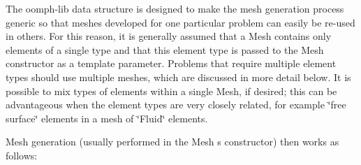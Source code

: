 The {\ttfamily oomph-\/lib} data structure is designed to make the mesh generation process generic so that meshes developed for one particular problem can easily be re-\/used in others. For this reason, it is generally assumed that a {\ttfamily Mesh} contains only elements of a single type and that this element type is passed to the {\ttfamily Mesh} constructor as a template parameter. Problems that require multiple element types should use multiple meshes, which are discussed in more detail below. It is possible to mix types of elements within a single {\ttfamily Mesh}, if desired; this can be advantageous when the element types are very closely related, for example \char`\"{}free surface\char`\"{} elements in a mesh of \char`\"{}\+Fluid\char`\"{} elements.

Mesh generation (usually performed in the {\ttfamily Mesh} \textquotesingle{}s constructor) then works as follows\+:
